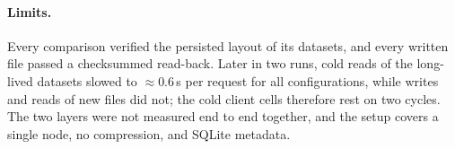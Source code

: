 \paragraph{Limits.} Every comparison verified the persisted layout of its
datasets, and every written file passed a checksummed read-back.
Later in two runs, cold reads of the long-lived datasets slowed to
${\approx}0.6$\,s per request for all configurations, while writes and
reads of new files did not; the cold client cells therefore rest on two
cycles. The two layers were not measured end to end together, and the
setup covers a single node, no compression, and SQLite metadata.


